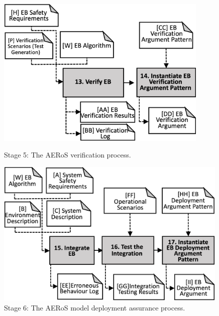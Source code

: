 \documentclass[runningheads]{llncs}
\begin{document}
\begin{figure}[!t]
	\centering
	\begin{minipage}{.5\textwidth}
		\centering
		\includegraphics[width=0.9\textwidth]{figures/AERoS-Stage5.png}%
		\vspace{-2ex}
		\caption{Stage 5: The AERoS verification process.}
		\label{amlas-a-stage5}
	\end{minipage}%
	\begin{minipage}{.5\textwidth}
		\centering
		\includegraphics[width=0.99\textwidth]{figures/AERoS-Stage6.png}%
		\vspace{-2ex}
		\caption{Stage 6: The AERoS model \newline deployment assurance process.}
		\label{amlas-a-stage6}
	\end{minipage}
	\vspace{-4ex}
\end{figure}
\end{document}
